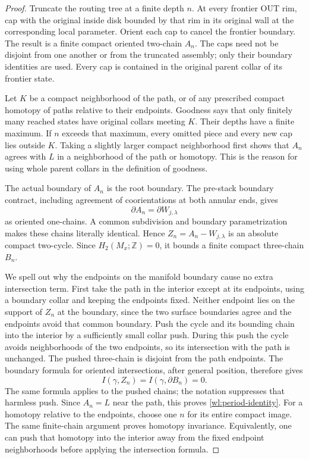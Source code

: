 \begin{proof}
Truncate the routing tree at a finite depth $n$.  At every frontier OUT rim,
cap with the original inside disk bounded by that rim in its original wall
at the corresponding local parameter.  Orient each cap to cancel the
frontier boundary.  The result is a finite compact oriented two-chain $A_n$.
The caps need not be disjoint from one another or from the truncated assembly;
only their boundary identities are used.  Every cap is contained in the
original parent collar of its frontier state.

Let $K$ be a compact neighborhood of the path, or of any prescribed compact
homotopy of paths relative to their endpoints.  Goodness says that only
finitely many reached states have original collars meeting $K$.  Their
depths have a finite maximum.  If $n$ exceeds that maximum, every omitted
piece and every new cap lies outside $K$.  Taking a slightly larger compact
neighborhood first shows that $A_n$ agrees with $L$ in a neighborhood of the
path or homotopy.  This is the reason for using whole parent collars in the
definition of goodness.

The actual boundary of $A_n$ is the root boundary.  The pre-stack boundary
contract, including agreement of coorientations at both annular ends, gives
\[
                     \partial A_n=\partial W_{j,\lambda}
\]
as oriented one-chains.  A common subdivision and boundary parametrization
makes these chains literally identical.  Hence
$Z_n=A_n-W_{j,\lambda}$ is an absolute compact two-cycle.  Since
$H_2(M_x;\mathbb Z)=0$, it bounds a finite compact three-chain $B_n$.

We spell out why the endpoints on the manifold boundary cause no extra
intersection term.  First take the path in the interior except at its
endpoints, using a boundary collar and keeping the endpoints fixed.  Neither
endpoint lies on the support of $Z_n$ at the boundary, since the two surface
boundaries agree and the endpoints avoid that common boundary.  Push the
cycle and its bounding chain into the interior by a sufficiently small
collar push.  During this push the cycle avoids neighborhoods of the two
endpoints, so its intersection with the path is unchanged.  The pushed
three-chain is disjoint from the path endpoints.  The boundary formula for
oriented intersections, after general position, therefore gives
\[
                  I(\gamma,Z_n)
                    =I(\gamma,\partial B_n)=0.
\]
The same formula applies to the pushed chains; the notation suppresses that
harmless push.  Since $A_n=L$ near the path, this proves
\eqref{wl:period-identity}.  For a homotopy relative to the endpoints, choose
one $n$ for its entire compact image.  The same finite-chain argument proves
homotopy invariance.  Equivalently, one can push that homotopy into the
interior away from the fixed endpoint neighborhoods before applying the
intersection formula.


\end{proof}
